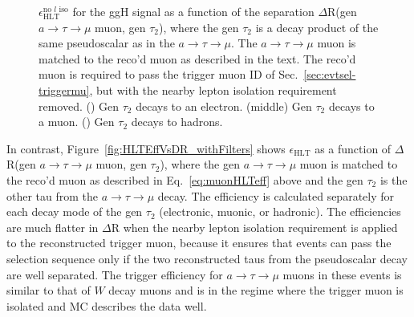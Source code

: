 \begin{figure}[hbtp]
\begin{center}
    \caption{$\epsilon_{\text{HLT}}^{\text{no }l\text{ iso}}$ for the ggH signal as a function of the separation $\Delta$R(gen $a\rightarrow\tau\rightarrow\mu$ muon, gen $\tau_{\text{2}}$), where the gen $\tau_{\text{2}}$ is a decay product of the same pseudoscalar as in the $a\rightarrow\tau\rightarrow\mu$.  The $a\rightarrow\tau\rightarrow\mu$ muon is matched to the reco'd muon as described in the text.  The reco'd muon is required to pass the trigger muon ID of Sec.~\ref{sec:evtsel-triggermu}, but with the nearby lepton isolation requirement removed.  (\cmsLeft) Gen $\tau_{\text{2}}$ decays to an electron.  (middle) Gen $\tau_{\text{2}}$ decays to a muon.  (\cmsRight) Gen $\tau_{\text{2}}$ decays to hadrons.}
    \label{fig:HLTEffVsDR}
  \end{center}
\end{figure}

In contrast, Figure~\ref{fig:HLTEffVsDR_withFilters} shows $\epsilon_{\text{HLT}}$ as a function of $\Delta$R(gen $a\rightarrow\tau\rightarrow\mu$ muon, gen $\tau_{\text{2}}$), where the gen $a\rightarrow\tau\rightarrow\mu$ muon is matched to the reco'd muon as described in Eq.~\ref{eq:muonHLTeff} above and the gen $\tau_{\text{2}}$ is the other tau from the $a\rightarrow\tau\rightarrow\mu$ decay.  The efficiency is calculated separately for each decay mode of the gen $\tau_{\text{2}}$ (electronic, muonic, or hadronic).  The efficiencies are much flatter in $\Delta$R when the nearby lepton isolation requirement is applied to the reconstructed trigger muon, because it ensures that events can pass the selection sequence only if the two reconstructed taus from the pseudoscalar decay are well separated.  The trigger efficiency for $a\rightarrow\tau\rightarrow\mu$ muons in these events is similar to that of $W$ decay muons and is in the regime where the trigger muon is isolated and MC describes the data well.

